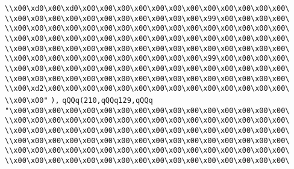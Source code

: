 \verb|\\x00\xd0\x00\xd0\x00\x00\x00\x00\x00\x00\x00\x00\x00\x00\x00\x00\|\newline
\verb|\\x00\x00\x00\x00\x00\x00\x00\x00\x00\x00\x00\x99\x00\x00\x00\x00\|\newline
\verb|\\x00\x00\x00\x00\x00\x00\x00\x00\x00\x00\x00\x00\x00\x00\x00\x00\|\newline
\verb|\\x00\x00\x00\x00\x00\x00\x00\x00\x00\x00\x00\x00\x00\x00\x00\x00\|\newline
\verb|\\x00\x00\x00\x00\x00\x00\x00\x00\x00\x00\x00\x00\x00\x00\x00\x00\|\newline
\verb|\\x00\x00\x00\x00\x00\x00\x00\x00\x00\x00\x00\x99\x00\x00\x00\x00\|\newline
\verb|\\x00\x00\x00\x00\x00\x00\x00\x00\x00\x00\x00\x00\x00\x00\x00\x00\|\newline
\verb|\\x00\x00\x00\x00\x00\x00\x00\x00\x00\x00\x00\x00\x00\x00\x00\x00\|\newline
\verb|\\x00\xd2\x00\x00\x00\x00\x00\x00\x00\x00\x00\x00\x00\x00\x00\x00\|\newline
\verb|\\x00\x00"|\newline
\verb|),|\newline
\verb|qQQq(210,qQQq129,qQQq|\newline
\verb|"\x00\x00\x00\x00\x00\x00\x00\x00\x00\x00\x00\x00\x00\x00\x00\x00\|\newline
\verb|\\x00\x00\x00\x00\x00\x00\x00\x00\x00\x00\x00\x00\x00\x00\x00\x00\|\newline
\verb|\\x00\x00\x00\x00\x00\x00\x00\x00\x00\x00\x00\x00\x00\x00\x00\x00\|\newline
\verb|\\x00\x00\x00\x00\x00\x00\x00\x00\x00\x00\x00\x00\x00\x00\x00\x00\|\newline
\verb|\\x00\x00\x00\x00\x00\x00\x00\x00\x00\x00\x00\x00\x00\x00\x00\x00\|\newline
\verb|\\x00\x00\x00\x00\x00\x00\x00\x00\x00\x00\x00\x00\x00\x00\x00\x00\|\newline
